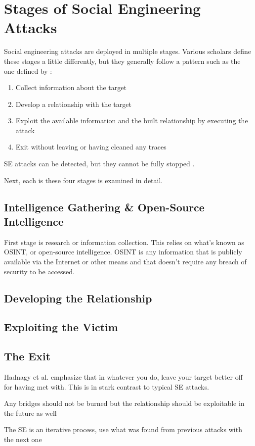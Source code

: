 \chapter{Stages of Social Engineering Attacks\label{stages}}

Social engineering attacks are deployed in multiple stages. Various scholars define these stages a little differently, but they generally follow a pattern such as the one defined by \cite{salahdine_social_2019}:

\begin{enumerate}
    \item Collect information about the target
    \item Develop a relationship with the target
    \item Exploit the available information and the built relationship by executing the attack
    \item Exit without leaving or having cleaned any traces
\end{enumerate}

SE attacks can be detected, but they cannot be fully stopped \citep{wang_defining_2020}.

Next, each is these four stages is examined in detail.

\section{Intelligence Gathering \& Open-Source Intelligence}

First stage is research or information collection. This relies on what's known as OSINT, or open-source intelligence. OSINT is any information that is publicly available via the Internet or other means and that doesn't require any breach of security to be accessed.

\section{Developing the Relationship}

\section{Exploiting the Victim}

\section{The Exit}

Hadnagy et al. emphasize that in whatever you do, leave your target better off for having met with. This is in stark contrast to typical SE attacks.

Any bridges should not be burned but the relationship should be exploitable in the future as well

The SE is an iterative process, use what was found from previous attacks with the next one